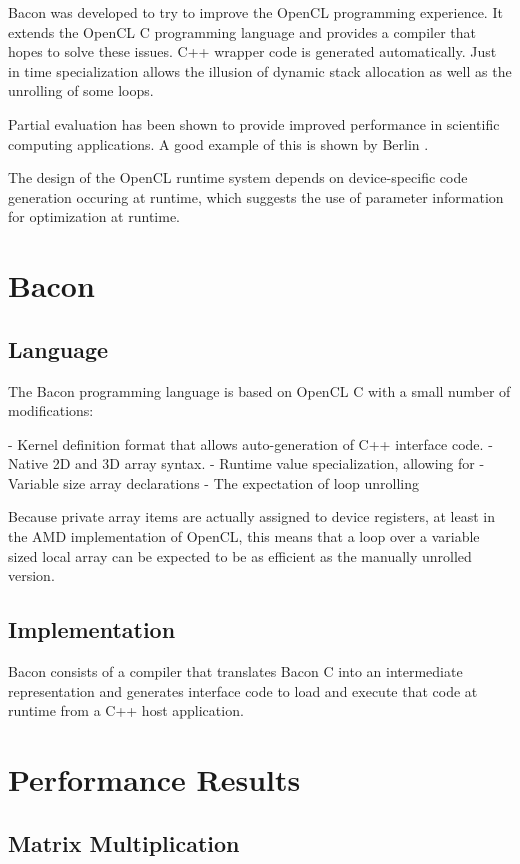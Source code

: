 \documentclass{llncs}
\begin{document}
Bacon was developed to try to improve the OpenCL programming
experience. It extends the OpenCL C programming language and provides
a compiler that hopes to solve these issues. C++ wrapper code is
generated automatically. Just in time specialization allows the 
illusion of dynamic stack allocation as well as the unrolling of
some loops.

Partial evaluation has been shown to provide improved performance in
scientific computing applications. A good example of this is shown by Berlin
\cite{Berlin:1990}.

The design of the OpenCL runtime system depends on device-specific
code generation occuring at runtime, which suggests the use of
parameter information for optimization at runtime.

\section{Bacon}
\subsection{Language}

The Bacon programming language is based on OpenCL C with a small
number of modifications:

- Kernel definition format that allows auto-generation of
  C++ interface code.
- Native 2D and 3D array syntax.
- Runtime value specialization, allowing for
  - Variable size array declarations
  - The expectation of loop unrolling

Because private array items are actually assigned to device registers,
at least in the AMD implementation of OpenCL, this means that a loop
over a variable sized local array can be expected to be as efficient
as the manually unrolled version.

\subsection{Implementation}

Bacon consists of a compiler that translates Bacon C into an
intermediate representation and generates interface code to load and
execute that code at runtime from a C++ host application.

\section{Performance Results}

\subsection{Matrix Multiplication}
\end{document}
